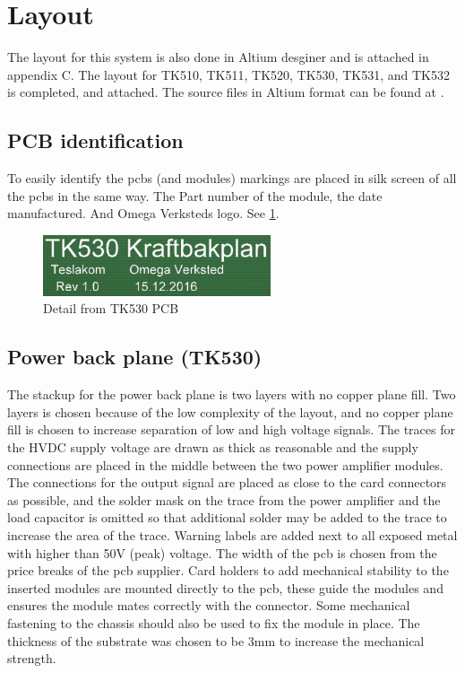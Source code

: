 \section{Layout}
The layout for this system is also done in Altium desginer and is attached in appendix C. The layout for TK510, TK511, TK520, TK530, TK531, and TK532 is completed, and attached. The source files in Altium format can be found at \citep{githubtesla}.

\subsection{PCB identification}
To easily identify the pcbs (and modules) markings are placed in silk screen of all the pcbs in the same way. The Part number of the module, the date manufactured. And Omega Verksteds logo. See \cref{fig:tk530_tekst}.
\begin{figure}
    \centering
    \includegraphics[width=0.6\textwidth]{img/TK530_Tekst.PNG}
    \caption{Detail from TK530 PCB}
    \label{fig:tk530_tekst}
\end{figure}

\subsection{Power back plane (TK530)}
The stackup for the power back plane is two layers with no copper plane fill. Two layers is chosen because of the low complexity of the layout, and no copper plane fill is chosen to increase separation of low and high voltage signals. The traces for the HVDC supply voltage are drawn as thick as reasonable and the supply connections are placed in the middle between the two power amplifier modules. The connections for the output signal are placed as close to the card connectors as possible, and the solder mask on the trace from the power amplifier and the load capacitor is omitted so that additional solder may be added to the trace to increase the area of the trace. Warning labels are added next to all exposed metal with higher than 50V (peak) voltage. The width of the pcb is chosen from the price breaks of the pcb supplier. Card holders to add mechanical stability to the inserted modules are mounted directly to the pcb, these guide the modules and ensures the module mates correctly with the connector. Some mechanical fastening to the chassis should also be used to fix the module in place. The thickness of the substrate was chosen to be 3mm to increase the mechanical strength.



